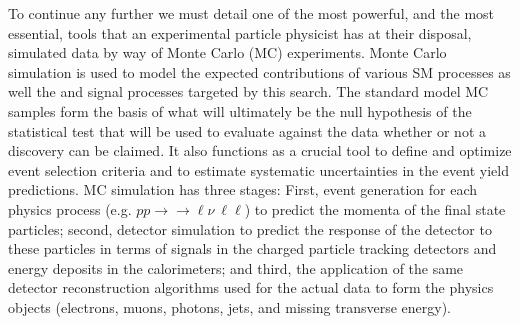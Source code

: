 To continue any further we must detail one of the most powerful, and the most essential, tools that an experimental particle physicist has at their disposal, simulated data by way of Monte Carlo (MC) experiments.
Monte Carlo simulation is used to model the expected contributions of various SM processes as well the \CCsignal and \CNsignal signal processes targeted by this search. 
The standard model MC samples form the basis of what will ultimately be the null hypothesis of the statistical test that will be used to evaluate against the data whether or not a discovery can be claimed. 
It also functions as a crucial tool to define and optimize event selection criteria and to estimate systematic uncertainties in the event yield predictions.
MC simulation has three stages: First, event generation for each physics process (e.g. $pp \rightarrow$\Wboson\Zboson$\rightarrow \ell\nu~\ell\ell$) to predict the momenta of the final state particles; second, detector simulation to predict the response of the detector to these particles in terms of signals in the charged particle tracking detectors and energy deposits in the calorimeters; and third, the application of the same detector reconstruction algorithms used for the actual data to form the physics objects (electrons, muons, photons, jets, and missing transverse energy).

